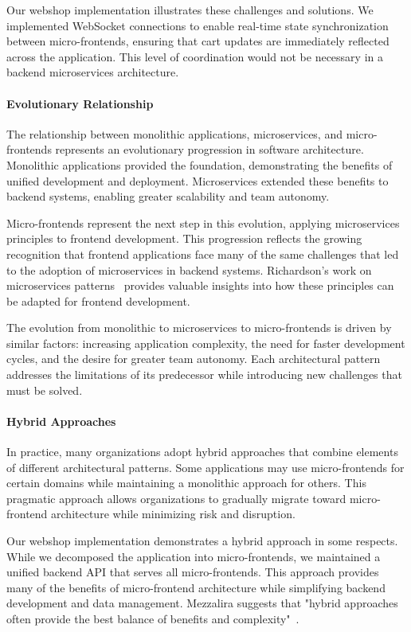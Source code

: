 \documentclass[12pt,a4paper]{report}
\begin{document}
Our webshop implementation illustrates these challenges and solutions. We implemented WebSocket connections to enable real-time state synchronization between micro-frontends, ensuring that cart updates are immediately reflected across the application. This level of coordination would not be necessary in a backend microservices architecture.

\paragraph{Evolutionary Relationship}

The relationship between monolithic applications, microservices, and micro-frontends represents an evolutionary progression in software architecture. Monolithic applications provided the foundation, demonstrating the benefits of unified development and deployment. Microservices extended these benefits to backend systems, enabling greater scalability and team autonomy.

Micro-frontends represent the next step in this evolution, applying microservices principles to frontend development. This progression reflects the growing recognition that frontend applications face many of the same challenges that led to the adoption of microservices in backend systems. Richardson's work on microservices patterns~\cite{richardson2018microservices} provides valuable insights into how these principles can be adapted for frontend development.

The evolution from monolithic to microservices to micro-frontends is driven by similar factors: increasing application complexity, the need for faster development cycles, and the desire for greater team autonomy. Each architectural pattern addresses the limitations of its predecessor while introducing new challenges that must be solved.

\paragraph{Hybrid Approaches}

In practice, many organizations adopt hybrid approaches that combine elements of different architectural patterns. Some applications may use micro-frontends for certain domains while maintaining a monolithic approach for others. This pragmatic approach allows organizations to gradually migrate toward micro-frontend architecture while minimizing risk and disruption.

Our webshop implementation demonstrates a hybrid approach in some respects. While we decomposed the application into micro-frontends, we maintained a unified backend API that serves all micro-frontends. This approach provides many of the benefits of micro-frontend architecture while simplifying backend development and data management. Mezzalira suggests that "hybrid approaches often provide the best balance of benefits and complexity"~\cite{mezzalira2021building}.
\end{document}
